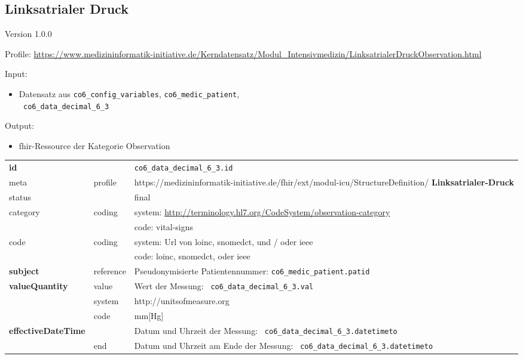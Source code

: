 \subsection{
Linksatrialer Druck} 
\noindent Version 1.0.0

\noindent Profile: \url{https://www.medizininformatik-initiative.de/Kerndatensatz/Modul_Intensivmedizin/LinksatrialerDruckObservation.html}

\noindent Input:
\begin{itemize}
	\item Datensatz aus \texttt{co6\_config\_variables}, \texttt{co6\_medic\_patient}, \\ \texttt{
co6\_data\_decimal\_6\_3}
\end{itemize}
Output:
\begin{itemize}
        \item \ac{fhir}-Ressource der Kategorie \glqq Observation\grqq{}
\end{itemize}
\begin{longtable}{|l|l|p{7.5cm}|}
        \hline
        \rowcolor{lightgray} \multicolumn{3}{|l|}{Data Mapping (inhaltlich)} \\ \hline
        \textbf{id} &  & \texttt{co6\_data\_decimal\_6\_3.id} \\ \hline
	meta & profile & https://medizininformatik-initiative.de/fhir/ext/modul-icu/StructureDefinition/\textbf{
Linksatrialer-Druck} \\ \hline 
	status &  & final   \\ \hline 
	category & coding & system: \url{http://terminology.hl7.org/CodeSystem/observation-category} \\
\cline{3-3}
	& & code: vital-signs \\ \hline
	code & coding & system: Url von \ac{loinc}, \ac{snomedct}, und / oder \ac{ieee} \\ 
	\cline{3-3} 
	 &  & code: \ac{loinc}, \ac{snomedct}, oder \ac{ieee} \\ \hline
	 \textbf{subject}  & reference & Pseudonymisierte Patientennummer: \texttt{co6\_medic\_patient.patid} \\ \hline
	 \textbf{valueQuantity}  & value & Wert der Messung: \texttt{
co6\_data\_decimal\_6\_3.val} \\
        \cline{2-3}
         & system & http://unitsofmeasure.org \\
         \cline{2-3}
         & code & mm[Hg] \\ \hline
     \textbf{effectiveDateTime}  & & Datum und Uhrzeit der Messung: \texttt{
co6\_data\_decimal\_6\_3.datetimeto} \\
    \cline{2-3}
     & end & Datum und Uhrzeit am Ende der Messung: \texttt{
co6\_data\_decimal\_6\_3.datetimeto} \\ \hline
\end{longtable}


